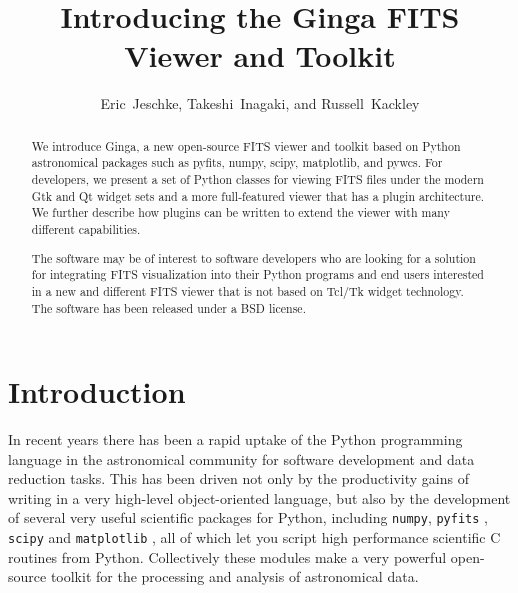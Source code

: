 
\resetcounters




\title{Introducing the Ginga FITS Viewer and Toolkit}
\author{Eric~Jeschke, Takeshi~Inagaki, and Russell~Kackley
}


\begin{abstract}
We introduce Ginga, a new open-source FITS
viewer and toolkit based on Python astronomical packages such as pyfits, numpy, scipy, matplotlib, and pywcs.  For developers, we present a set of Python classes for viewing FITS files under the modern Gtk and Qt widget sets and a more  full-featured viewer that has a plugin architecture. We further describe how plugins can be written to extend the viewer with many different capabilities.  

The software may be of interest to software developers who are looking for a solution for integrating FITS visualization into their Python programs and end users interested in a new and different FITS viewer that is not based on Tcl/Tk widget technology.  The software has been released under a BSD license.
\end{abstract}

\section{Introduction}
In recent years there has been a rapid uptake of the Python programming language in the astronomical community for software development and data reduction tasks. This has been driven not only by the productivity gains of writing in a very high-level object-oriented language, but also by the development of several very useful scientific packages for Python, including  {\tt {}numpy}, {\tt {}pyfits} \citep{Barrett99}, {\tt {}scipy} and {\tt {}matplotlib} \citep{matplotlib}, all of which let you script high performance scientific C routines from Python. Collectively these modules make a very powerful open-source toolkit for the processing and analysis of astronomical data.


